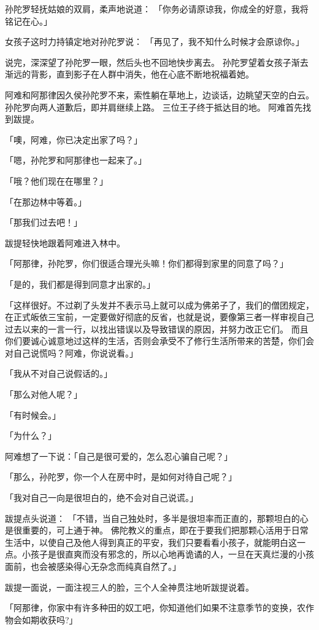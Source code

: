 \documentclass[twoside,openany]{book}
\begin{document}
孙陀罗轻抚姑娘的双肩，柔声地说道：
「你务必请原谅我，你成全的好意，我将铭记在心。」

女孩子这时力持镇定地对孙陀罗说：
「再见了，我不知什么时候才会原谅你。」

说完，深深望了孙陀罗一眼，然后头也不回地快步离去。
孙陀罗望着女孩子渐去渐远的背影，直到影子在人群中消失，他在心底不断地祝福着她。

阿难和阿那律因久侯孙陀罗不来，索性躺在草地上，边谈话，边眺望天空的白云。
孙陀罗向两人道歉后，即并肩继续上路。
三位王子终于抵达目的地。
阿难首先找到跋提。

「噢，阿难，你已决定出家了吗？」

「嗯，孙陀罗和阿那律也一起来了。」

「哦？他们现在在哪里？」

「在那边林中等着。」

「那我们过去吧！」

跋提轻快地跟着阿难进入林中。

「阿那律，孙陀罗，你们很适合理光头嘛！你们都得到家里的同意了吗？」

「是的，我们都是得到同意才出家的。」

「这样很好。不过剃了头发并不表示马上就可以成为佛弟子了，我们的僧团规定，在正式皈依三宝前，一定要做好彻底的反省，也就是说，要像第三者一样审视自己过去以来的一言一行，以找出错误以及导致错误的原因，并努力改正它们。
而且你们要诚心诚意地过这样的生活，否则会承受不了修行生活所带来的苦楚，你们会对自己说慌吗？阿难，你说说看。」

「我从不对自己说假话的。」

「那么对他人呢？」

「有时候会。」

「为什么？」

阿难想了一下说：「自己是很可爱的，怎么忍心骗自己呢？」

「那么，孙陀罗，你一个人在房中时，是如何对待自己呢？」

「我对自己一向是很坦白的，绝不会对自己说谎。」

跋提点头说道：
「不错，当自己独处时，多半是很坦率而正直的，那颗坦白的心是很重要的，可上通于神。
佛陀教义的重点，即在于要我们把那颗心活用于日常生活中，以使自己及他人得到真正的平安，我们只要看看小孩子，就能明白这一点。小孩子是很直爽而没有邪念的，所以心地再诡谲的人，一旦在天真烂漫的小孩面前，也会被感染得心无杂念而纯真自然了。」

跋提一面说，一面注视三人的脸，三个人全神贯注地听跋提说着。

「阿那律，你家中有许多种田的奴工吧，你知道他们如果不注意季节的变换，农作物会如期收获吗?」
\end{document}
